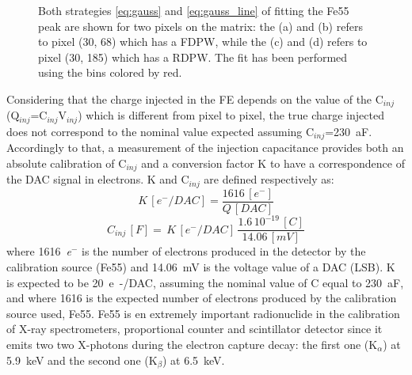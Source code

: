 \begin{figure}
\begin{subfigure}[b]{0.49\textwidth}
                \caption{}
                \label{fig:gauss_line_c185}
            \end{subfigure}
            \caption{Both strategies \ref{eq:gauss} and \ref{eq:gauss_line} of fitting the Fe55 peak are shown for two pixels on the matrix: the (a) and (b) refers to pixel (30, 68) which has a FDPW, while the (c) and (d) refers to pixel (30, 185) which has a RDPW. The fit has been performed using the bins colored by red.}
            \label{fig:Fe55_spectrum_pixels}
       \end{figure}

        Considering that the charge injected in the FE depends on the value of the C$_{inj}$ (Q$_{inj}$=C$_{inj}$V$_{inj}$) which is different from pixel to pixel, the true charge injected does not correspond to the nominal value expected assuming C$_{inj}$=\SI{230}{aF}.
        Accordingly to that, a measurement of the injection capacitance provides both an absolute calibration of C$_{inj}$ and a conversion factor K to have a correspondence of the DAC signal in electrons. 
        K and C$_{inj}$ are defined respectively as:
        \begin{equation}
            K\, [\si{\elementarycharge}^-/\si{DAC}] = \frac{1616\,[\si{\elementarycharge}^-]}{Q\,[\si{DAC}]}
        \end{equation}
        \begin{equation}
            C_{inj}\,[\si{F}] =\, K\,[\si{\elementarycharge}^-/\si{DAC}] \, \frac{1.6\,10^{-19}\,[\si{C}]}{14.06\,[\si{mV}]}
        \end{equation}
        where \SI{1616}{\elementarycharge}$^-$ is the number of electrons produced in the detector by the calibration source (Fe55) and \SI{14.06}{mV} is the voltage value of a DAC (LSB). 
        K is expected to be \SI{20}{e-/DAC}, assuming the nominal value of C equal to \SI{230}{aF}, and where 1616 is the expected number of electrons produced by the calibration source used, Fe55. Fe55 is en extremely important radionuclide in the calibration of X-ray spectrometers, proportional counter and scintillator detector since it emits two two X-photons during the electron capture decay: the first one (K$_\alpha$) at \SI{5.9}{keV} and the second one (K$_\beta$) at \SI{6.5}{keV}.
